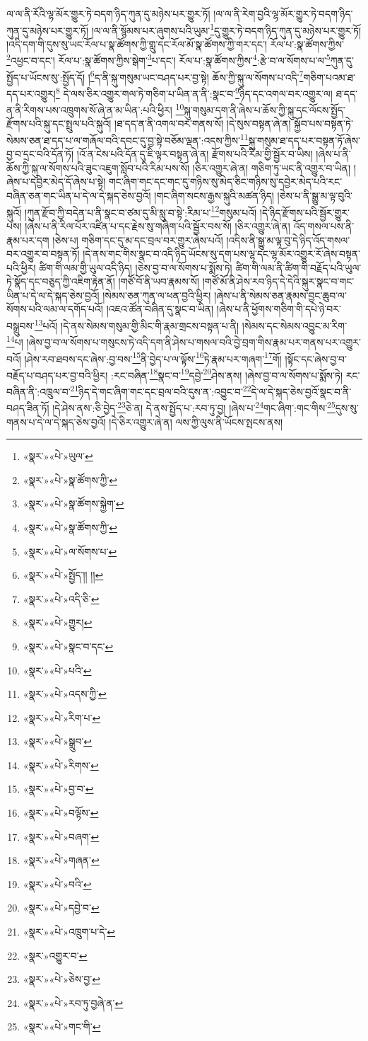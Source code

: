 ལ་ལ་ནི་རོའི་ལྷ་མོར་གྱུར་ཏེ་བདག་ཉིད་ཀུན་དུ་མཉེས་པར་གྱུར་ཏོ། །ལ་ལ་ནི་རེག་བྱའི་ལྷ་མོར་གྱུར་ཏེ་བདག་ཉིད་ཀུན་དུ་མཉེས་པར་གྱུར་ཏོ། །ལ་ལ་ནི་སྙོམས་པར་ཞུགས་པའི་ཡུམ་\footnote{«སྣར་»«པེ་»ཡུལ་}དུ་གྱུར་ཏེ་བདག་ཉིད་ཀུན་དུ་མཉེས་པར་གྱུར་ཏོ། །འདི་དག་གི་དུས་སུ་ཡང་རོལ་པ་སྣ་ཚོགས་ཀྱི་གླུ་དང་རོལ་མོ་སྣ་ཚོགས་ཀྱི་གར་དང་། རོལ་པ་:སྣ་ཚོགས་ཀྱིས་\footnote{«སྣར་»«པེ་»སྣ་ཚོགས་ཀྱི་}འཕྱང་བ་དང་། རོལ་པ་:སྣ་ཚོགས་ཀྱིས་སྒེག་\footnote{«སྣར་»«པེ་»སྣ་ཚོགས་སྐྱེག་}པ་དང་། རོལ་པ་:སྣ་ཚོགས་ཀྱིས་\footnote{«སྣར་»«པེ་»སྣ་ཚོགས་ཀྱི་}:རྩེ་བ་ལ་སོགས་པ་ལ་\footnote{«སྣར་»«པེ་»ལ་སོགས་པ་}ཀུན་དུ་སྤྱོད་པ་ཡོངས་སུ་:སྤྱོད་དོ། །\footnote{«སྣར་»«པེ་»སྤྱོད་།། །།}ད་ནི་སྐུ་གསུམ་ཡང་བཤད་པར་བྱ་སྟེ། ཆོས་ཀྱི་སྐུ་ལ་སོགས་པ་འདི་\footnote{«སྣར་»«པེ་»འདི་ཅི་}གཅིག་པའམ་ཐ་དད་པར་འགྱུར།\footnote{«སྣར་»«པེ་»གྱུར།} དེ་ལས་ཅིར་འགྱུར་གལ་ཏེ་གཅིག་པ་ཡིན་ན་ནི་:སྣང་བ་\footnote{«སྣར་»«པེ་»སྣང་བ་དང་}ཉིད་དང་འགལ་བར་འགྱུར་ལ། ཐ་དད་ན་ནི་རིགས་པས་འཁྲུགས་སོ་ཞེ་ན་མ་ཡིན་:པའི་ཕྱིར། \footnote{«སྣར་»«པེ་»པའི་}སྐུ་གསུམ་དག་ནི་ཞེས་པ་ཆོས་ཀྱི་སྐུ་དང་ལོངས་སྤྱོད་རྫོགས་པའི་སྐུ་དང་སྤྲུལ་པའི་སྐུའོ། །ཐ་དད་ན་ནི་འགལ་བར་གནས་སོ། །དེ་སུས་བསྟན་ཞེ་ན། སྐྱོབ་པས་བསྟན་ཏེ་སེམས་ཅན་ཐ་དད་པ་ལ་གཞོལ་བའི་དབང་དུ་བྱ་སྟེ་བཅོམ་ལྡན་:འདས་ཀྱིས་\footnote{«སྣར་»«པེ་»འདས་ཀྱི་}སྐུ་གསུམ་ཐ་དད་པར་བསྟན་ཏོ་ཞེས་བྱ་བ་དྲང་བའི་དོན་ཏོ། །འོ་ན་ངེས་པའི་དོན་དུ་ཇི་ལྟར་བསྟན་ཞེ་ན། རྫོགས་པའི་རིམ་གྱི་སྦྱོར་བ་ཡིས། །ཞེས་པ་ནི་ཆོས་ཀྱི་སྐུ་ལ་སོགས་པའི་ཟུང་འཇུག་སློབ་པའི་རིམ་པས་སོ། །ཅིར་འགྱུར་ཞེ་ན། གཅིག་ཏུ་ཡང་ནི་འགྱུར་བ་ཡིན། །ཞེས་པ་དབྱེར་མེད་དོ་ཞེས་པ་སྟེ། གང་ཞིག་གང་དང་གང་དུ་གཉིས་སུ་མེད་ཅིང་གཉིས་སུ་དབྱེར་མེད་པའི་རང་བཞིན་ཅན་གང་ཡིན་པ་དེ་ལ་དེ་སྐད་ཅེས་བྱའོ། །གང་ཞིག་སངས་རྒྱས་སྐུའི་མཚན་ཉིད། །ཅེས་པ་ནི་སྒྱུ་མ་ལྟ་བུའི་སྐུའོ། །ཀུན་རྫོབ་ཀྱི་བདེན་པ་ནི་སྣང་བ་ཙམ་དུ་མི་སླུ་བ་སྟེ་:རིམ་པ་\footnote{«སྣར་»«པེ་»རིག་པ་}གསུམ་པའོ། །དེ་ཉིད་རྫོགས་པའི་སྦྱོར་གྱུར་པས། །ཞེས་པ་ནི་རིལ་པོར་འཛིན་པ་དང་རྗེས་སུ་གཞིག་པའི་སྦྱོར་བས་སོ། །ཅིར་འགྱུར་ཞེ་ན། འོད་གསལ་པས་ནི་རྣམ་པར་དག །ཅེས་པ། གཅིག་དང་དུ་མ་དང་བྲལ་བར་གྱུར་ཞེས་པའོ། །འདིས་ནི་སྒྱུ་མ་ལྟ་བུ་དེ་ཉིད་འོད་གསལ་བར་འགྱུར་བ་བསྟན་ཏོ། །དེ་ནས་གང་གིས་སྣང་བ་འདི་ཉིད་ཡོངས་སུ་དག་པས་ལྷ་དང་ལྷ་མོར་འགྱུར་རོ་ཞེས་བསྟན་པའི་ཕྱིར། ཚིག་གི་ལམ་གྱི་ཡུལ་འདི་ཉིད། །ཅེས་བྱ་བ་ལ་སོགས་པ་སྨོས་ཏེ། ཚིག་གི་ལམ་ནི་ཚིག་གི་བརྗོད་པའི་ཡུལ་ཏེ་སྣོད་དང་བཅུད་ཀྱི་འཇིག་རྟེན་ནོ། །གཙོ་བོ་ནི་ཡབ་རྣམས་སོ། །གཙོ་མོ་ནི་ཤེས་རབ་ཉིད་དེ་དེའི་སྐུར་སྣང་བ་གང་ཡིན་པ་དེ་ལ་དེ་སྐད་ཅེས་བྱའོ། །སེམས་ཅན་ཀུན་ལ་ཕན་བྱའི་ཕྱིར། །ཞེས་པ་ནི་སེམས་ཅན་རྣམས་བྱང་ཆུབ་ལ་སོགས་པའི་ལམ་ལ་དགོད་པའོ། །འཇའ་ཚོན་བཞིན་དུ་སྣང་བ་ཡིན། །ཞེས་པ་ནི་ཕྱོགས་གཅིག་གི་དཔེ་ཉེ་བར་བསྒྲུབས་\footnote{«སྣར་»«པེ་»སྒྲུབ་}པའོ། །དེ་ནས་སེམས་གསུམ་གྱི་མིང་གི་རྣམ་གྲངས་བསྟན་པ་ནི། །སེམས་དང་སེམས་འབྱུང་མ་རིག་\footnote{«སྣར་»«པེ་»རིགས་}པ། །ཞེས་བྱ་བ་ལ་སོགས་པ་གསུངས་ཏེ་འདི་དག་ནི་ཤེས་པ་གསལ་བའི་བྱེ་བྲག་གིས་རྣམ་པར་གནས་པར་འགྱུར་བའོ། །ཤེས་རབ་ཐབས་དང་ཞེས་:བྱ་བས་\footnote{«སྣར་»«པེ་»བྱ་བ་}ནི་བྱེད་པ་ལ་ལྟོས་\footnote{«སྣར་»«པེ་»བལྟོས་}ཏེ་རྣམ་པར་གཞག་\footnote{«སྣར་»«པེ་»བཞག་}གོ། །སྟོང་དང་ཞེས་བྱ་བ་བརྗོད་པ་བཤད་པར་བྱ་བའི་ཕྱིར། :རང་བཞིན་\footnote{«སྣར་»«པེ་»གཞན་}སྣང་བ་\footnote{«སྣར་»«པེ་»བའི་}དབྱེ་\footnote{«སྣར་»«པེ་»དབྱེ་བ་}ཤེས་ནས། །ཞེས་བྱ་བ་ལ་སོགས་པ་སྨོས་ཏེ། རང་བཞིན་ནི་:འཁྲུལ་བ་\footnote{«སྣར་»«པེ་»འཁྲུག་པ་དེ་}ཉིད་དེ་གང་ཞིག་གང་དང་བྲལ་བའི་དུས་ན་:འབྱུང་བ་\footnote{«སྣར་»འགྱུར་བ་}དེ་ལ་དེ་སྐད་ཅེས་བྱའོ་སྣང་བ་ནི་བཤད་ཟིན་ཏོ། །དེ་ཤེས་ནས་:ཅི་བྱེད་\footnote{«སྣར་»«པེ་»ཅེས་བྱ་}ཅེ་ན། དེ་ནས་སྤྱོད་པ་:རབ་ཏུ་བྱ། །ཞེས་པ་\footnote{«སྣར་»«པེ་»རབ་ཏུ་བྱཞེ་ན་}གང་ཞིག་:གང་གིས་\footnote{«སྣར་»«པེ་»གང་གི་}དུས་སུ་གནས་པ་དེ་ལ་དེ་སྐད་ཅེས་བྱའོ། །དེ་ཅིར་འགྱུར་ཞེ་ན། ལས་ཀྱི་ལུས་ནི་ཡོངས་སྤངས་ནས། 
